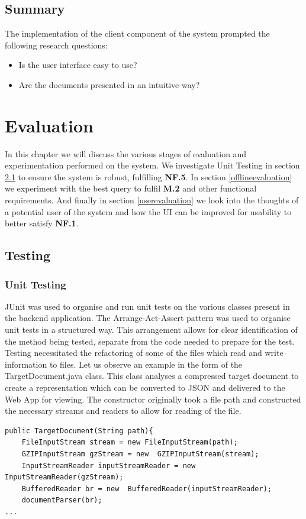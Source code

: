 \documentclass{l4proj}
\begin{document}
\section{Summary} \label{clientsummary}
The implementation of the client component of the system prompted the following research questions:
\begin{itemize}
\item Is the user interface easy to use?
\item Are the documents presented in an intuitive way?
\end{itemize}

\chapter{Evaluation} \label{evaluation}
In this chapter we will discuss the various stages of evaluation and experimentation performed on the system.
We investigate Unit Testing in section \ref{testing} to ensure the system is robust, fulfilling \textbf{NF.5}.
In section \ref{offlineevaluation} we experiment with the best query to fulfil \textbf{M.2} and other functional requirements.
And finally in section \ref{userevaluation} we look into the thoughts of a potential user of the system and how the UI can be improved for usability to better satisfy \textbf{NF.1}.
\section{Testing} \label{testing}
\subsection{Unit Testing}
JUnit was used to organise and run unit tests on the various classes present in the backend application.
The Arrange-Act-Assert pattern was used to organise unit tests in a structured way. This arrangement allows for clear identification of the method being tested, separate from the code needed to prepare for the test.
Testing necessitated the refactoring of some of the files which read and write information to files. Let us observe an example in the form of the TargetDocument.java class. This class analyses a compressed target document to create a representation which can be converted to JSON and delivered to the Web App for viewing.
The constructor originally took a file path and constructed the necessary streams and readers to allow for reading of the file.
\begin{verbatim}
public TargetDocument(String path){
    FileInputStream stream = new FileInputStream(path);
    GZIPInputStream gzStream = new  GZIPInputStream(stream);
    InputStreamReader inputStreamReader = new  InputStreamReader(gzStream);
    BufferedReader br = new  BufferedReader(inputStreamReader);
    documentParser(br);
...
\end{verbatim}
\end{document}
